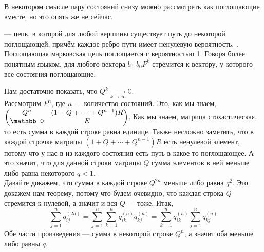 \documentclass{article}
\begin{document}
\begin{itemize}
\begin{Comment}
            \begin{center}
            \end{center}
            В некотором смысле пару состояний снизу можно рассмотреть как поглощающие вместе, но это опять же не сейчас.
        \end{Comment}
        \dfn {} --- цепь, в которой для любой вершины существует путь до некоторой поглощающей, причём каждое ребро пути имеет ненулевую вероятность.
        \thm {}. Поглощающая марковская цепь поглощается с вероятностью 1. Говоря более понятным языком, для любого вектора $b_0$ $b_0P^k$ стремится к вектору, у которого все состояния поглощающие.
        \begin{Proof}
            Нам достаточно показать, что $Q^k\underset{k\to\infty}\rightarrow\mathbb0$.\\
            Рассмотрим $P^n$, где $n$ --- количество состояний. Это, как мы знаем, $\matr{Q^n & (1+Q+\cdots+Q^{n-1})R\\\mathbb0 & E}$. Как мы знаем, матрица стохастическая, то есть сумма в каждой строке равна единице. Также несложно заметить, что в каждой строчке матрицы $(1+Q+\cdots+Q^{n-1})R$ есть ненулевой элемент, потому что у нас в из каждого состояния есть путь в какое-то поглощающее. А это значит, что для данной строки матрицы $Q$ сумма элементов в ней меньше либо равна некоторого $q<1$.\\
            Давайте докажем, что сумма в каждой строке $Q^{2n}$ меньше либо равна $q^2$. Это докажем нам теорему, потому что будем очевидно, что каждая строка $Q$ стремится к нулевой, а значит и вся $Q$ --- тоже. Итак,
            $$
            \sum\limits_{j=1}^nq^{(2n)}_{ij}=\sum\limits_{j=1}^n\sum\limits_{k=1}^nq^{(n)}_{ik}q^{(n)}_{kj}=\sum\limits_{k=1}^nq^{(n)}_{ik}\sum\limits_{j=1}^nq^{(n)}_{kj}
            $$
            Обе части произведения --- сумма в некоторой строке $Q^n$, а значит оба меньше либо равны $q$.

\end{Proof}
\end{itemize}
\end{document}
